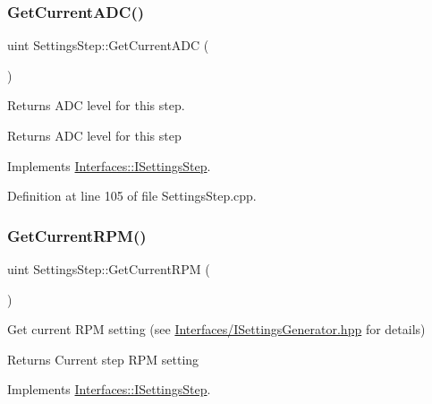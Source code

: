 \subsubsection{\texorpdfstring{Get\+Current\+A\+D\+C()}{GetCurrentADC()}}
{\footnotesize\ttfamily uint Settings\+Step\+::\+Get\+Current\+A\+DC (\begin{DoxyParamCaption}{ }\end{DoxyParamCaption})\hspace{0.3cm}{\ttfamily [virtual]}}



Returns A\+DC level for this step. 

\begin{DoxyReturn}{Returns}
A\+DC level for this step 
\end{DoxyReturn}


Implements \hyperlink{class_interfaces_1_1_i_settings_step_a54d5ce3350791e080bcb75d472376abf}{Interfaces\+::\+I\+Settings\+Step}.



Definition at line 105 of file Settings\+Step.\+cpp.

\mbox{\label{class_settings_step_aaba560b593af9bc96eeed3db01a469f4}} 
\subsubsection{\texorpdfstring{Get\+Current\+R\+P\+M()}{GetCurrentRPM()}}
{\footnotesize\ttfamily uint Settings\+Step\+::\+Get\+Current\+R\+PM (\begin{DoxyParamCaption}{ }\end{DoxyParamCaption})\hspace{0.3cm}{\ttfamily [virtual]}}



Get current R\+PM setting (see \hyperlink{_i_settings_generator_8hpp_source}{Interfaces/\+I\+Settings\+Generator.\+hpp} for details) 

\begin{DoxyReturn}{Returns}
Current step R\+PM setting 
\end{DoxyReturn}


Implements \hyperlink{class_interfaces_1_1_i_settings_step_ac2b2370bf70fb09a9e1da4db922e8903}{Interfaces\+::\+I\+Settings\+Step}.



